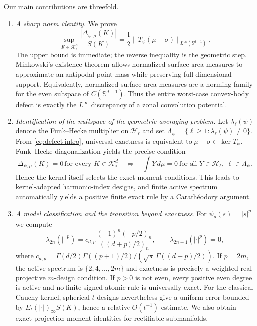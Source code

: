 \documentclass[12pt,a4paper]{article}
\newcommand{\Sph}{\mathbb S}
\newcommand{\K}{\mathcal K}
\newcommand{\Harm}{\mathcal H}
\theoremstyle{plain}
\theoremstyle{definition}
\begin{document}
Our main contributions are threefold.
\begin{enumerate}
\item \emph{A sharp norm identity.} We prove
\begin{equation}\label{eq:defect-intro}
 \sup_{K\in\K^d_\circ}\frac{|\Delta_{\psi,\mu}(K)|}{S(K)}
 =\frac12\|T_\psi(\mu-\sigma)\|_{L^\infty(\Sph^{d-1})}.
\end{equation}
The upper bound is immediate; the reverse inequality is the geometric step. Minkowski's existence theorem allows normalized surface area measures to approximate an antipodal point mass while preserving full-dimensional support. Equivalently, normalized surface area measures are a norming family for the even subspace of $C(\Sph^{d-1})$. Thus the entire worst-case convex-body defect is exactly the $L^\infty$ discrepancy of a zonal convolution potential.

\item \emph{Identification of the nullspace of the geometric averaging problem.} Let $\lambda_\ell(\psi)$ denote the Funk--Hecke multiplier on $\Harm_\ell$ and set $\Lambda_\psi=\{\ell\ge1:\lambda_\ell(\psi)\ne0\}$. From \eqref{eq:defect-intro}, universal exactness is equivalent to $\mu-\sigma\in\ker T_\psi$. Funk--Hecke diagonalization yields the precise condition
\begin{equation}\label{eq:criterion-intro}
 \Delta_{\psi,\mu}(K)=0\ \text{for every }K\in\K^d_\circ
 \quad\Longleftrightarrow\quad
 \int Y\,d\mu=0\ \text{for all }Y\in\Harm_\ell,\ \ell\in\Lambda_\psi.
\end{equation}
Hence the kernel itself selects the exact moment conditions. This leads to kernel-adapted harmonic-index designs, and finite active spectrum automatically yields a positive finite exact rule by a Carath\'eodory argument.

\item \emph{A model classification and the transition beyond exactness.} For $\psi_p(s)=|s|^p$ we compute
\begin{equation}\label{eq:power-mult-intro}
 \lambda_{2n}(|\cdot|^p)
 =c_{d,p}\frac{(-1)^n(-p/2)_n}{((d+p)/2)_n},
 \qquad \lambda_{2n+1}(|\cdot|^p)=0,
\end{equation}
where $c_{d,p}=\Gamma(d/2)\Gamma((p+1)/2)/(\sqrt\pi\,\Gamma((d+p)/2))$. If $p=2m$, the active spectrum is $\{2,4,\ldots,2m\}$ and exactness is precisely a weighted real projective $m$-design condition. If $p>0$ is not even, every positive even degree is active and no finite signed atomic rule is universally exact. For the classical Cauchy kernel, spherical $t$-designs nevertheless give a uniform error bounded by $E_t(|\cdot|)_\infty S(K)$, hence a relative $O(t^{-1})$ estimate. We also obtain exact projection-moment identities for rectifiable submanifolds.
\end{enumerate}
\end{document}
